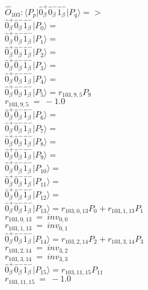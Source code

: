 \documentclass[14pt]{article}
\begin{document}
    $\hat{O}_{103}:  \langle{P_p}\vert \hat{0}_{\beta}^{+}\hat{0}_{\beta}^{-}\hat{1}_{\beta}^{-} \vert{P_q}\rangle => $ \\ 
    $ \hat{0}_{\beta}^{+}\hat{0}_{\beta}^{-}\hat{1}_{\beta}^{-} \vert{P_{0}}\rangle =  $ \\ 
    $ \hat{0}_{\beta}^{+}\hat{0}_{\beta}^{-}\hat{1}_{\beta}^{-} \vert{P_{1}}\rangle =  $ \\ 
    $ \hat{0}_{\beta}^{+}\hat{0}_{\beta}^{-}\hat{1}_{\beta}^{-} \vert{P_{2}}\rangle =  $ \\ 
    $ \hat{0}_{\beta}^{+}\hat{0}_{\beta}^{-}\hat{1}_{\beta}^{-} \vert{P_{3}}\rangle =  $ \\ 
    $ \hat{0}_{\beta}^{+}\hat{0}_{\beta}^{-}\hat{1}_{\beta}^{-} \vert{P_{4}}\rangle =  $ \\ 
    $ \hat{0}_{\beta}^{+}\hat{0}_{\beta}^{-}\hat{1}_{\beta}^{-} \vert{P_{5}}\rangle = {r}_{103,9,5}P_{9} $ \\ 
    ${r}_{103,9,5}\ =\ -1.0 $ \\ 
    $ \hat{0}_{\beta}^{+}\hat{0}_{\beta}^{-}\hat{1}_{\beta}^{-} \vert{P_{6}}\rangle =  $ \\ 
    $ \hat{0}_{\beta}^{+}\hat{0}_{\beta}^{-}\hat{1}_{\beta}^{-} \vert{P_{7}}\rangle =  $ \\ 
    $ \hat{0}_{\beta}^{+}\hat{0}_{\beta}^{-}\hat{1}_{\beta}^{-} \vert{P_{8}}\rangle =  $ \\ 
    $ \hat{0}_{\beta}^{+}\hat{0}_{\beta}^{-}\hat{1}_{\beta}^{-} \vert{P_{9}}\rangle =  $ \\ 
    $ \hat{0}_{\beta}^{+}\hat{0}_{\beta}^{-}\hat{1}_{\beta}^{-} \vert{P_{10}}\rangle =  $ \\ 
    $ \hat{0}_{\beta}^{+}\hat{0}_{\beta}^{-}\hat{1}_{\beta}^{-} \vert{P_{11}}\rangle =  $ \\ 
    $ \hat{0}_{\beta}^{+}\hat{0}_{\beta}^{-}\hat{1}_{\beta}^{-} \vert{P_{12}}\rangle =  $ \\ 
    $ \hat{0}_{\beta}^{+}\hat{0}_{\beta}^{-}\hat{1}_{\beta}^{-} \vert{P_{13}}\rangle = {r}_{103,0,13}P_{0}+{r}_{103,1,13}P_{1} $ \\ 
    ${r}_{103,0,13}\ =\ {inv}_{0,0} $ \\ 
    ${r}_{103,1,13}\ =\ {inv}_{0,1} $ \\ 
    $ \hat{0}_{\beta}^{+}\hat{0}_{\beta}^{-}\hat{1}_{\beta}^{-} \vert{P_{14}}\rangle = {r}_{103,2,14}P_{2}+{r}_{103,3,14}P_{3} $ \\ 
    ${r}_{103,2,14}\ =\ {inv}_{3,2} $ \\ 
    ${r}_{103,3,14}\ =\ {inv}_{3,3} $ \\ 
    $ \hat{0}_{\beta}^{+}\hat{0}_{\beta}^{-}\hat{1}_{\beta}^{-} \vert{P_{15}}\rangle = {r}_{103,11,15}P_{11} $ \\ 
    ${r}_{103,11,15}\ =\ -1.0 $ \\ 
    
\end{document}
